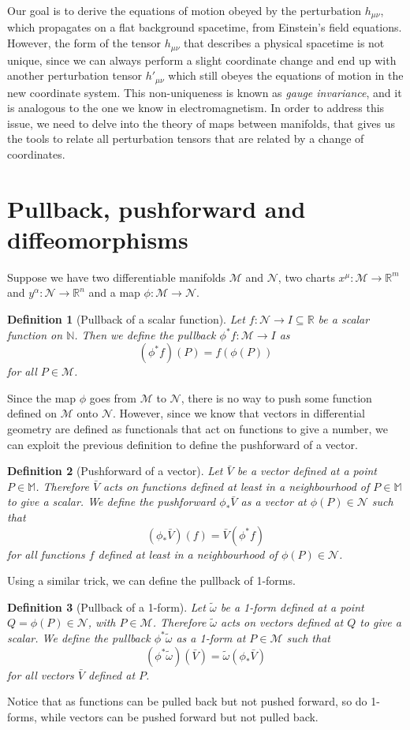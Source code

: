 \documentclass[a4paper]{article}
\newtheorem{definition}{Definition}
\begin{document}
Our goal is to derive the equations of motion obeyed by the perturbation $h_{\mu\nu}$, which propagates on a flat background spacetime, from Einstein's field equations. However, the form of the tensor $h_{\mu\nu}$ that describes a physical spacetime is not unique, since we can always perform a slight coordinate change and end up with another perturbation tensor $h'_{\mu\nu}$ which still obeyes the equations of motion in the new coordinate system. This non-uniqueness is known as \textit{gauge invariance}, and it is analogous to the one we know in electromagnetism.
In order to address this issue, we need to delve into the theory of maps between manifolds, that gives us the tools to relate all perturbation tensors that are related by a change of coordinates.

\section{Pullback, pushforward and diffeomorphisms}
Suppose we have two differentiable manifolds $\mathcal{M}$ and $\mathcal{N}$, two charts $x^{\mu}: \mathcal{M} \rightarrow \mathbb{R}^m$ and $y^{\alpha}: \mathcal{N} \rightarrow \mathbb{R}^n$ and a map $\phi: \mathcal{M} \rightarrow \mathcal{N}$.
\begin{definition}[Pullback of a scalar function]
    Let $f: \mathcal{N} \rightarrow I \subseteq \mathbb{R}$ be a scalar function on $\mathbb{N}$. Then we define the pullback $\phi^*f: \mathcal{M} \rightarrow I$ as
    $$(\phi^*f)(P) = f(\phi(P))$$
    for all $P \in \mathcal{M}$.
\end{definition}
Since the map $\phi$ goes from $\mathcal{M}$ to $\mathcal{N}$, there is no way to push some function defined on $\mathcal{M}$ onto $\mathcal{N}$. However, since we know that vectors in differential geometry are defined as functionals that act on functions to give a number, we can exploit the previous definition to define the pushforward of a vector.
\begin{definition}[Pushforward of a vector]
    Let $\bar{V}$ be a vector defined at a point $P \in \mathbb{M}$. Therefore $\bar{V}$ acts on functions defined at least in a neighbourhood of $P \in \mathbb{M}$ to give a scalar. We define the pushforward $\phi_*\bar{V}$ as a vector at $\phi(P)\in \mathcal{N}$ such that
    $$(\phi_*\bar{V})(f) = \bar{V}(\phi^*f)$$
    for all functions $f$ defined at least in a neighbourhood of $\phi(P) \in \mathcal{N}$.
\end{definition}
Using a similar trick, we can define the pullback of 1-forms.
\begin{definition}[Pullback of a 1-form]
    Let $\tilde{\omega}$ be a 1-form defined at a point $Q = \phi(P) \in \mathcal{N}$, with $P \in \mathcal{M}$. Therefore $\tilde{\omega}$ acts on vectors defined at $Q$ to give a scalar. We define the pullback $\phi^*\tilde{\omega}$ as a 1-form at $P \in \mathcal{M}$ such that
    $$(\phi^*\tilde{\omega})(\bar{V}) = \tilde{\omega}(\phi_*\bar{V})$$
    for all vectors $\bar{V}$ defined at $P$.
\end{definition}
Notice that as functions can be pulled back but not pushed forward, so do 1-forms, while vectors can be pushed forward but not pulled back.
\end{document}
